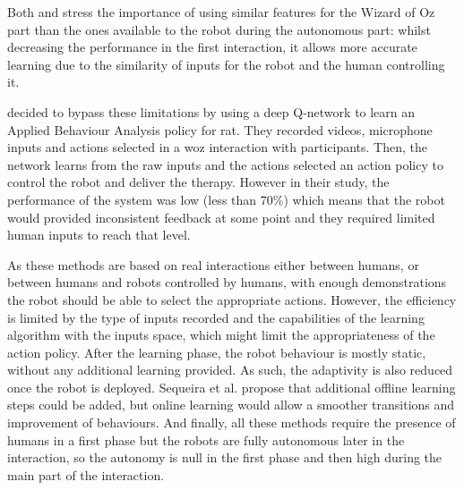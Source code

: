     Both \citet{knox2014learning} and \citet{sequeira2016discovering} stress the importance of using similar features for the Wizard of Oz part than the ones available to the robot during the autonomous part: whilst decreasing the performance in the first interaction, it allows more accurate learning due to the similarity of inputs for the robot and the human controlling it.
        
    \cite{clark2018deep} decided to bypass these limitations by using a deep Q-network \citep{mnih2015human} to learn an Applied Behaviour Analysis policy for \gls{rat}. They recorded videos, microphone inputs and actions selected in a \gls{woz} interaction with participants. Then, the network learns from the raw inputs and the actions selected an action policy to control the robot and deliver the therapy. However in their study, the performance of the system was low (less than 70\%) which means that the robot would provided inconsistent feedback at some point and they required limited human inputs to reach that level. 
     
    As these methods are based on real interactions either between humans, or between humans and robots controlled by humans, with enough demonstrations the robot should be able to select the appropriate actions. However, the efficiency is limited by the type of inputs recorded and the capabilities of the learning algorithm with the inputs space, which might limit the appropriateness of the action policy. After the learning phase, the robot behaviour is  mostly static, without any additional learning provided. As such, the adaptivity is also reduced once the robot is deployed. Sequeira et al. propose that additional offline learning steps could be added, but online learning would allow a smoother transitions and improvement of behaviours.
    And finally, all these methods require the presence of humans in a first phase but the robots are fully autonomous later in the interaction, so the autonomy is null in the first phase and then high during the main part of the interaction.
    
